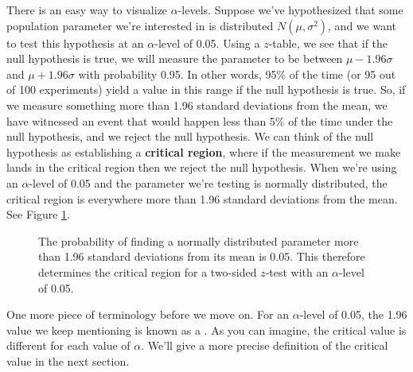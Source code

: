 There is an easy way to visualize $\alpha$-levels.  Suppose we've hypothesized that some population parameter we're interested in is distributed $N(\mu,\sigma^2)$, and we want to test this hypothesis at an $\alpha$-level of 0.05.  Using a $z$-table, we see that if the null hypothesis is true, we will measure the parameter to be between $\mu - 1.96\sigma$ and $\mu + 1.96\sigma$ with probability 0.95. In other words, 95\% of the time (or 95 out of 100 experiments) yield a value in this range if the null hypothesis is true.  So, if we measure something more than 1.96 standard deviations from the mean, we have witnessed an event that would happen less than 5\% of the time under the null hypothesis, and we reject the null hypothesis.  We can think of the null hypothesis as establishing a \textbf{critical region},  where if the measurement we make lands in the critical region then we reject the null hypothesis.  When we're using an $\alpha$-level of 0.05 and the parameter we're testing is normally distributed, the critical region is everywhere more than 1.96 standard deviations from the mean.  See Figure \ref{fig:twosidedz}.



\begin{figure}[h!]

\begin{center}


\caption{\label{fig:twosidedz} The probability of finding a normally distributed parameter more than 1.96 standard deviations from its mean is 0.05.  This therefore determines the critical region for a two-sided $z$-test with an $\alpha$-level of 0.05.}

\end{center}\end{figure}



One more piece of terminology before we move on.  For an $\alpha$-level of 0.05, the 1.96 value we keep mentioning is known as a . As you can imagine, the critical value is different for each value of $\alpha$.  We'll give a more precise definition of the critical value in the next section.







